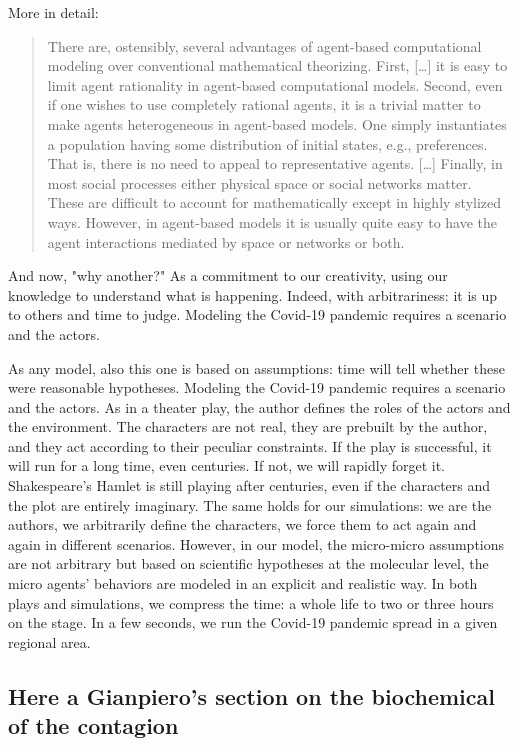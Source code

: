 \documentclass[graybox]{svmult}
\begin{document}
More in detail:
\begin{quote} 
There are, ostensibly, several advantages of agent-based computational modeling over conventional mathematical theorizing. First, [\ldots] it is easy to limit agent rationality in agent-based computational models. Second, even if one wishes to use completely rational agents, it is a trivial matter to make agents heterogeneous in agent-based models. One simply instantiates a population having some distribution of initial states, e.g., preferences. That is, there is no need to appeal to representative agents. [\ldots] Finally, in most social processes either physical space or social networks matter. These are difficult to account for mathematically except in highly stylized ways. However, in agent-based models it is usually quite easy to have the agent interactions mediated by space or networks or both.
\end{quote}

And now, "why another?" As a commitment to our creativity, using our knowledge to understand what is happening. Indeed, with arbitrariness: it is up to others and time to judge. Modeling the Covid-19 pandemic requires a scenario and the actors.

As any model, also this one is based on assumptions: time will tell whether these were reasonable hypotheses. Modeling the Covid-19 pandemic requires a scenario and the actors. As in a theater play, the author defines the roles of the actors and the environment. The characters are not real, they are prebuilt by the author, and they act according to their peculiar constraints. If the play is successful, it will run for a long time, even centuries. If not, we will rapidly forget it. Shakespeare’s Hamlet is still playing after centuries, even if the characters and the plot are entirely imaginary. The same holds for our simulations: we are the authors, we arbitrarily define the characters, we force them to act again and again in different scenarios. However, in our model, the micro-micro assumptions are not arbitrary but based on scientific hypotheses at the molecular level, the micro agents’ behaviors are modeled in an explicit and realistic way. In both plays and simulations, we compress the time: a whole life to two or three hours on the stage. In a few seconds, we run the Covid-19 pandemic spread in a given regional area.



\subsection{Here a Gianpiero's section on the biochemical of the contagion}
\label{biochem}
\end{document}
